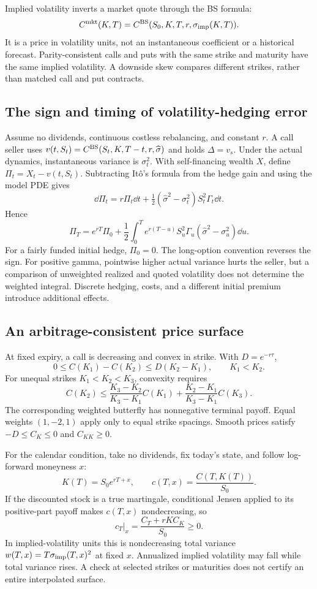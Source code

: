 Implied volatility inverts a market quote through the BS formula:
\[
C^{\rm mkt}(K,T)=C^{\rm BS}(S_0,K,T,r,\sigma_{\rm imp}(K,T)).
\]
It is a price in volatility units, not an instantaneous coefficient or a
historical forecast. Parity-consistent calls and puts with the same strike
and maturity have the same implied volatility. A downside skew compares
different strikes, rather than matched call and put contracts.

\subsection{The sign and timing of volatility-hedging error}
Assume no dividends, continuous costless rebalancing, and constant \(r\).
A call seller uses \(v(t,S_t)=C^{\rm BS}(S_t,K,T-t,r,\widehat\sigma)\)
and holds \(\Delta=v_s\). Under the actual dynamics, instantaneous
variance is \(\sigma_t^2\). With self-financing wealth \(X\), define
\(\Pi_t=X_t-v(t,S_t)\). Subtracting It\^o's formula from the hedge gain
and using the model PDE gives
\[
\dd\Pi_t=r\Pi_t\dd t+
\tfrac12(\widehat\sigma^2-\sigma_t^2)S_t^2\Gamma_t\dd t.
\]
Hence
\[
\boxed{\Pi_T=e^{rT}\Pi_0+
\frac12\int_0^Te^{r(T-u)}S_u^2\Gamma_u
(\widehat\sigma^2-\sigma_u^2)\dd u.}
\]
For a fairly funded initial hedge, \(\Pi_0=0\). The long-option convention
reverses the sign. For positive gamma, pointwise higher actual variance
hurts the seller, but a comparison of unweighted realized and quoted
volatility does not determine the weighted integral. Discrete hedging,
costs, and a different initial premium introduce additional effects.

\subsection{An arbitrage-consistent price surface}
At fixed expiry, a call is decreasing and convex in strike. With
\(D=e^{-r\tau}\),
\[
0\leq C(K_1)-C(K_2)\leq D(K_2-K_1),\qquad K_1<K_2.
\]
For unequal strikes \(K_1<K_2<K_3\), convexity requires
\[
C(K_2)\leq
\frac{K_3-K_2}{K_3-K_1}C(K_1)
+\frac{K_2-K_1}{K_3-K_1}C(K_3).
\]
The corresponding weighted butterfly has nonnegative terminal payoff.
Equal weights \((1,-2,1)\) apply only to equal strike spacings. Smooth
prices satisfy \(-D\leq C_K\leq0\) and \(C_{KK}\geq0\).

For the calendar condition, take no dividends, fix today's state, and
follow log-forward moneyness \(x\):
\[
K(T)=S_0e^{rT+x},\qquad c(T,x)=\frac{C(T,K(T))}{S_0}.
\]
If the discounted stock is a true martingale, conditional Jensen
applied to its positive-part payoff makes \(c(T,x)\) nondecreasing, so
\[
\boxed{c_T\big|_x=\frac{C_T+rKC_K}{S_0}\geq0.}
\]
In implied-volatility units this is nondecreasing total variance
\(w(T,x)=T\sigma_{\rm imp}(T,x)^2\) at fixed \(x\). Annualized implied
volatility may fall while total variance rises. A check at selected
strikes or maturities does not certify an entire interpolated surface.

